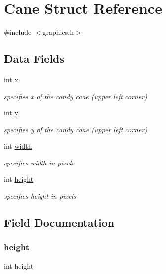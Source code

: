 \hypertarget{struct_cane}{}\section{Cane Struct Reference}
\label{struct_cane}


{\ttfamily \#include $<$graphics.\+h$>$}

\subsection*{Data Fields}
\begin{DoxyCompactItemize}
\item 
int \hyperlink{struct_cane_a6150e0515f7202e2fb518f7206ed97dc}{x}
\begin{DoxyCompactList}\small\item\em specifies x of the candy cane (upper left corner) \end{DoxyCompactList}\item 
int \hyperlink{struct_cane_a0a2f84ed7838f07779ae24c5a9086d33}{y}
\begin{DoxyCompactList}\small\item\em specifies y of the candy cane (upper left corner) \end{DoxyCompactList}\item 
int \hyperlink{struct_cane_a2474a5474cbff19523a51eb1de01cda4}{width}
\begin{DoxyCompactList}\small\item\em specifies width in pixels \end{DoxyCompactList}\item 
int \hyperlink{struct_cane_ad12fc34ce789bce6c8a05d8a17138534}{height}
\begin{DoxyCompactList}\small\item\em specifies height in pixels \end{DoxyCompactList}\end{DoxyCompactItemize}


\subsection{Field Documentation}
\mbox{\label{struct_cane_ad12fc34ce789bce6c8a05d8a17138534}} 
\subsubsection{\texorpdfstring{height}{height}}
{\footnotesize\ttfamily int height}



